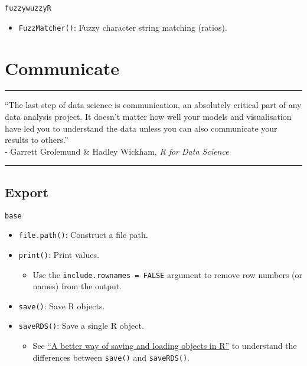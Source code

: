 \documentclass[]{book}
\providecommand{\tightlist}{%
  \setlength{\itemsep}{0pt}\setlength{\parskip}{0pt}}
\begin{document}
\texttt{fuzzywuzzyR}

\begin{itemize}
\tightlist
\item
  \texttt{FuzzMatcher()}: Fuzzy character string matching (ratios).
\end{itemize}

\hypertarget{communicate}{%
\chapter{Communicate}\label{communicate}}

\begin{center}\rule{0.5\linewidth}{\linethickness}\end{center}

``The last step of data science is communication, an absolutely critical part of any data analysis project. It doesn't matter how well your models and visualisation have led you to understand the data unless you can also communicate your results to others.''\\
- Garrett Grolemund \& Hadley Wickham, \emph{R for Data Science}

\begin{center}\rule{0.5\linewidth}{\linethickness}\end{center}

\hypertarget{export}{%
\section{Export}\label{export}}

\texttt{base}

\begin{itemize}
\tightlist
\item
  \texttt{file.path()}: Construct a file path.
\item
  \texttt{print()}: Print values.

  \begin{itemize}
  \tightlist
  \item
    Use the \texttt{include.rownames\ =\ FALSE} argument to remove row numbers (or names) from the output.
  \end{itemize}
\item
  \texttt{save()}: Save R objects.
\item
  \texttt{saveRDS()}: Save a single R object.

  \begin{itemize}
  \tightlist
  \item
    See \href{https://www.fromthebottomoftheheap.net/2012/04/01/saving-and-loading-r-objects/}{``A better way of saving and loading objects in R''} to understand the differences between \texttt{save()} and \texttt{saveRDS()}.
  \end{itemize}
\end{itemize}
\end{document}
